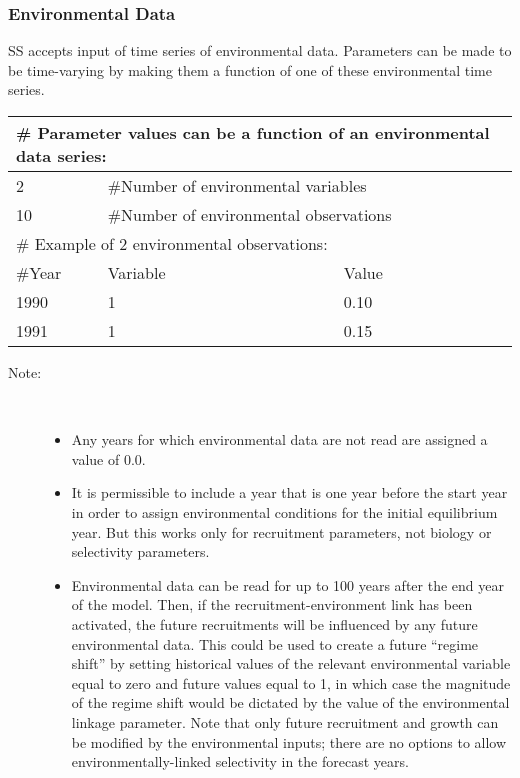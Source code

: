 \subsubsection{Environmental Data}
SS accepts input of time series of environmental data.  Parameters can be made to be time-varying by making them a function of one of these environmental time series.

\begin{center}
	\begin{tabular}{p{3cm} p{3cm} p{3cm}}
		\multicolumn{3}{l}{\# Parameter values can be a function of an environmental data series: }\\
		\hline
		2 & \multicolumn{2}{l}{\#Number of environmental variables}\\
		\hline
		10 & \multicolumn{2}{l}{\#Number of environmental observations}\\
		\hline
		\multicolumn{3}{l}{\# Example of 2 environmental observations:}\\
		\hline
		\#Year & Variable & Value \\
		\hline
		1990 & 1 & 0.10 \\
		1991 & 1 & 0.15 \\
		\hline
	\end{tabular}
\end{center}

\begin{description}
	\item[Note:]\
	\begin{itemize}
		\item Any years for which environmental data are not read are assigned a value of 0.0.
		\item It is permissible to include a year that is one year before the start year in order to assign environmental conditions for the initial equilibrium year.  But this works only for recruitment parameters, not biology or selectivity parameters.
		\item Environmental data can be read for up to 100 years after the end year of the model.  Then, if the recruitment-environment link has been activated, the future recruitments will be influenced by any future environmental data.  This could be used to create a future “regime shift” by setting historical values of the relevant environmental variable equal to zero and future values equal to 1, in which case the magnitude of the regime shift would be dictated by the value of the environmental linkage parameter.  Note that only future recruitment and growth can be modified by the environmental inputs; there are no options to allow environmentally-linked selectivity in the forecast years.
	\end{itemize}
\end{description}

